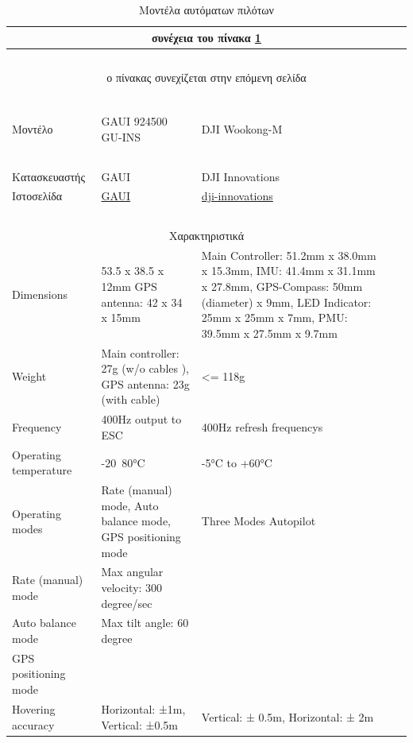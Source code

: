 \documentclass[a4paper, 12pt, twoside]{report}
\begin{document}
{{{{{{\begin{landscape}
			\begin{longtable} { m{3cm} m{3.5cm} m{3.5cm} m{3.5cm} m{3.5cm} }
					\caption [Μοντέλα αυτόματων πιλότων]{Μοντέλα αυτόματων πιλότων}
					\label{πιν.:Μοντέλα αυτόματων πιλότων}\\
					\hline
					\endfirsthead
					\multicolumn{5}{c}{συνέχεια του πίνακα \ref{πιν.:Μοντέλα αυτόματων πιλότων}}\\
					\hline
					~\\
					\endhead
					\hline
					\multicolumn{5}{c}{ο πίνακας συνεχίζεται στην επόμενη σελίδα}\\
					\endfoot
					\multicolumn{5}{c}{ολοκληρώθηκε ο πίνακας \ref{πιν.:Μοντέλα αυτόματων πιλότων}}\\
					\endlastfoot
					~\\
					Μοντέλο & GAUI 924500 GU-INS & DJI Wookong-M &  & \\
					\hdashline
					~\\
					Κατασκευαστής & GAUI & DJI Innovations &  & \\
					Ιστοσελίδα & \href{http://www.gaui.com.tw/html/shopping_view.asp?sn=1443}{GAUI} & \href{http://www.dji-innovations.com/products/wookong-m/overview/}{dji-innovations} & & \\
					\hdashline
					~\\
					\multicolumn{5}{c}{Χαρακτηριστικά}\\
					\hdashline
					Dimensions & 53.5 x 38.5 x 12mm GPS antenna: 42 x 34 x  15mm & Main Controller: 51.2mm x 38.0mm x 15.3mm, IMU: 41.4mm x 31.1mm x 27.8mm, GPS-Compass: 50mm (diameter) x 9mm, LED Indicator: 25mm x 25mm x 7mm, PMU: 39.5mm x 27.5mm x 9.7mm & & \\
					Weight & Main controller: 27g (w/o cables ), GPS antenna: 23g (with cable) & <= 118g & & \\
					Frequency & 400Hz output to ESC & 400Hz refresh frequencys & & \\
					Operating temperature & -20~80°C & -5°C to +60°C & & \\
					Operating modes & Rate (manual) mode, Auto balance mode, GPS positioning  mode & Three Modes Autopilot & & \\
					Rate (manual) mode & Max angular velocity: 300 degree/sec & & & \\
					Auto balance mode & Max tilt angle: 60 degree & & & \\
					GPS positioning mode & & & & \\
					Hovering accuracy & Horizontal: ±1m, Vertical: ±0.5m & Vertical: ± 0.5m, Horizontal: ± 2m & & \\

\end{longtable}
\end{landscape}}}}}}}
\end{document}
